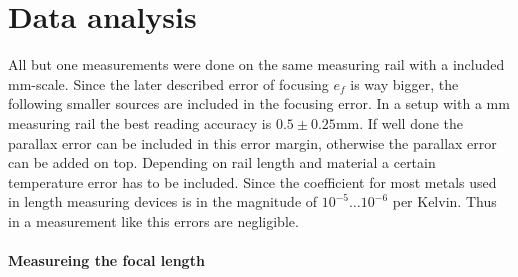 \section{Data analysis}

All but one measurements were done on the same measuring rail with a  included \si{\milli \m}-scale. 
Since the later described error of focusing $e_f$ is way bigger, the following smaller sources are included in the focusing error.
In a setup with a \si{\milli \m} measuring rail the best reading accuracy is $0.5 \pm 0.25$\si{\milli \m}. 
If well done the parallax error can be included in this error margin, otherwise the parallax error can be added on top.
Depending on rail length and material a certain temperature error has to be included. 
Since the coefficient for most metals used in length measuring devices is in the magnitude of $10^{-5} \dots 10^{-6}$ per Kelvin.
Thus in a measurement like this errors are negligible. 

\paragraph{Measureing the focal length} 
